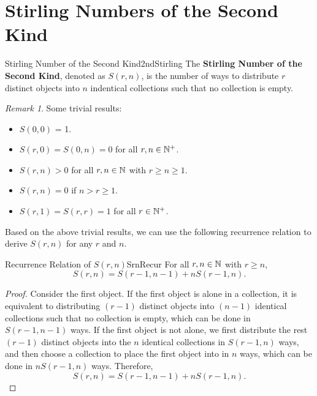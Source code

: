 \documentclass[math]{amznotes}
\theoremstyle{remark}
\newtheorem*{remark}{Remark}
\begin{document}
\section{Stirling Numbers of the Second Kind}
\begin{dfnbox}{Stirling Number of the Second Kind}{2ndStirling}
    The {\color{red} \textbf{Stirling Number of the Second Kind}}, denoted as $S(r, n)$, is the number of ways to distribute $r$ distinct objects into $n$ indentical collections such that no collection is empty.
\end{dfnbox}
\begin{notebox}
    \begin{remark}
        Some trivial results:
        \begin{itemize}
            \item $S(0, 0)$ = 1.
            \item $S(r, 0) = S(0, n) = 0$ for all $r, n \in \mathbb{N}^+$.
            \item $S(r, n) > 0$ for all $r, n \in \mathbb{N}$ with $r \geq n \geq 1$.
            \item $S(r, n) = 0$ if $n > r \geq 1$.
            \item $S(r, 1) = S(r, r) = 1$ for all $r \in \mathbb{N}^+$.
        \end{itemize}
    \end{remark}
\end{notebox}
Based on the above trivial results, we can use the following recurrence relation to derive $S(r, n)$ for any $r$ and $n$.
\begin{thmbox}{Recurrence Relation of $S(r, n)$}{SrnRecur}
    For all $r, n \in \mathbb{N}$ with $r \geq n$,
    \begin{equation*}
        S(r, n) = S(r - 1, n - 1) + nS(r - 1, n).
    \end{equation*}
    \tcblower
    \begin{proof}
        Consider the first object. If the first object is alone in a collection, it is equivalent to distributing $(r - 1)$ distinct objects into $(n - 1)$ identical collections such that no collection is empty, which can be done in $S(r - 1, n - 1)$ ways. If the first object is not alone, we first distribute the rest $(r - 1)$ distinct objects into the $n$ identical collections in $S(r - 1, n)$ ways, and then choose a collection to place the first object into in $n$ ways, which can be done in $nS(r - 1, n)$ ways. Therefore, 
        \begin{equation*}
            S(r, n) = S(r - 1, n - 1) + nS(r - 1, n).
        \end{equation*}
    \end{proof}
\end{thmbox}
\end{document}

